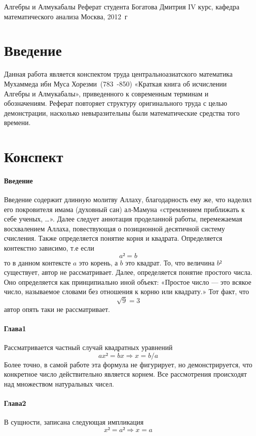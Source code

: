 \documentclass[unicode, 10pt, a4paper, oneside, fleqn]{article}
\begin{document}
          {Алгебры и Алмукабалы}
          {Реферат студента Богатова Дмитрия}
          {IV курс, кафедра математического анализа}
          {Москва, 2012~г}
\section{Введение}
Данная работа является конспектом труда
центральноазиатского математика Мухаммеда ибн Муса Хорезми~(783~-850)
«Краткая книга об исчислении Алгебры и Алмукабалы», приведенного к современным
терминам и обозначениям. Реферат повторяет структуру оригинального труда с целью
демонстрации, насколько невыразительны были математические средства того времени.
\section{Конспект}
\paragraph{Введение}
 Введение содержит длинную молитву Аллаху, благодарность
ему же, что наделил его покровителя имама (духовный сан) ал-Мамуна
«стремлением приближать к себе ученых, …». Далее следует аннотация
проделанной работы, перемежаемая восхвалением Аллаха, повествующая
о позиционной десятичной систему счисления. Также определяется понятие
корня и квадрата. Определяется контекстно зависимо, т.е если
\begin{displaymath}
  a² = b
\end{displaymath}
то в данном контексте $a$ это корень, а $b$ это квадрат. То, что величина
$b²$ существует, автор не рассматривает. Далее, определяется понятие простого числа.
Оно определяется как принципиально иной объект: «Простое число — это всякое число,
называемое словами без отношения к корню или квадрату.» Тот факт, что
$$ \sqrt{9} = 3 $$
автор опять таки не рассматривает.
\paragraph{Глава1}
 Рассматривается частный случай квадратных уравнений
 \begin{displaymath}
   ax² = bx ⇒x = b/a
 \end{displaymath}
Более точно, в самой работе эта формула не фигурирует, но демонстрируется, что конкретное
число действительно является корнем. Все рассмотрения происходят над множеством
натуральных чисел.
\paragraph{Глава2}
В сущности, записана следующая импликация
\begin{displaymath}
  x² = a² ⇒ x = a
\end{displaymath}
\end{document}
